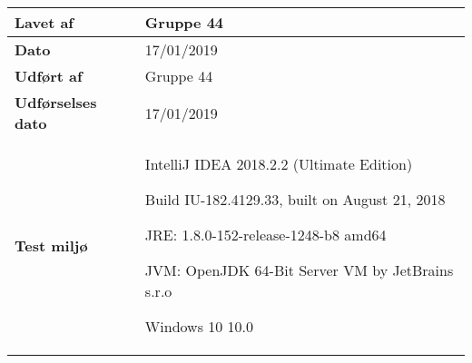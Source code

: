 \documentclass[class=article, crop=false]{standalone}
\makeatletter
\let\savespace\@minipagetrue
\makeatother
\begin{document}
\begin{table}[H]
\begin{tabularx}{\textwidth}{|l|X|}
            \textbf{Lavet af} & Gruppe 44\\ \hline
            \textbf{Dato} & 17/01/2019 \\ \hline
            \textbf{Udført af } & Gruppe 44\\ \hline
            \textbf{Udførselses dato}  & 17/01/2019\\ \hline
            \textbf{Test miljø}  &  \savespace \begin{compactitem}
                                                   \item IntelliJ IDEA 2018.2.2 (Ultimate Edition)
                                                   \item Build IU-182.4129.33, built on August 21, 2018
                                                   \item JRE: 1.8.0-152-release-1248-b8 amd64
                                                   \item JVM: OpenJDK 64-Bit Server VM by JetBrains s.r.o
                                                   \item Windows 10 10.0
            \end{compactitem} \\ \hline
        \end{tabularx}
    \end{table}
\end{document}
